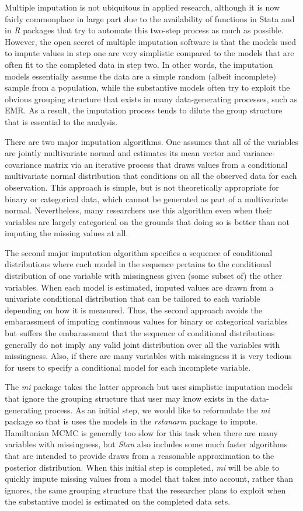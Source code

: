 \documentclass[11pt,notitlepage]{article}
\begin{document}
Multiple imputation is not ubiquitous in applied research, although it is now fairly commonplace
in large part due to the availability of functions in Stata and in \textit{R} packages that try
to automate this two-step process as much as possible. However, the open secret of multiple
imputation software is that the models used to impute values in step one are very simplistic
compared to the models that are often fit to the completed data in step two. In other words,
the imputation models essentially assume the data are a simple random (albeit incomplete)
sample from a population, while the substantive models often try to exploit the obvious
grouping structure that exists in many data-generating processes, such as EMR. As a result,
the imputation process tends to dilute the group structure that is essential to the analysis.

There are two major imputation algorithms. One assumes that all of the variables are jointly
multivariate normal and estimates its mean vector and variance-covariance matrix via an
iterative process that draws values from a conditional multivariate normal distribution that
conditions on all the observed data for each observation. This approach is simple, but is 
not theoretically appropriate for binary or categorical data, which cannot be generated as
part of a multivariate normal. Nevertheless, many researchers use this algorithm even when
their variables are largely categorical on the grounds that doing so is better than not
imputing the missing values at all.

The second major imputation algorithm specifies a sequence of conditional distributions
where each model in the sequence pertains to the conditional distribution of one variable with
missingness given (some subset of) the other variables. When each model is estimated, imputed
values are drawn from a univariate conditional distribution that can be tailored to each 
variable depending on how it is measured. Thus, the second approach avoids the embarassment
of imputing continuous values for binary or categorical variables but suffers the embarassment
that the sequence of conditional distributions generally do not imply any valid joint 
distribution over all the variables with missingness. Also, if there are many variables with
missingness it is very tedious for users to specify a conditional model for each incomplete
variable.

The \textit{mi} package takes the latter approach but uses simplistic imputation models that 
ignore the grouping structure that user may know exists in the data-generating process. As
an initial step, we would like to reformulate the \textit{mi} package so that is uses the
models in the \textit{rstanarm} package to impute. Hamiltonian MCMC is generally too slow
for this task when there are many variables with missingness, but \textit{Stan} also includes
some much faster algorithms that are intended to provide draws from a reasonable approximation
to the posterior distribution. When this initial step is completed, \textit{mi} will be able
to quickly impute missing values from a model that takes into account, rather than ignores,
the same grouping structure that the researcher plans to exploit when the substantive model
is estimated on the completed data sets.
\end{document}
